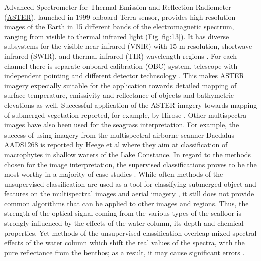 \documentclass[10pt, a4paper]{article}
\begin{document}
Advanced Spectrometer for Thermal Emission and Reflection Radiometer (\href{http://asterweb.jpl.nasa.gov/}{ASTER}), launched in
1999 onboard Terra sensor, provides high-resolution images of the Earth in 15 different bands of the
electromagnetic spectrum, ranging from visible to thermal infrared light  (Fig.\ref{fig:13}). It has diverse
subsystems for the visible near infrared (VNIR) with 15 m resolution, shortwave infrared (SWIR), and
thermal infrared (TIR) wavelength regions \cite{Kalinowski04}\label{Kalinowski04}. For each channel there is separate
onboard calibration (OBC) system, telescope with independent pointing and different detector technsology \cite{Arai05}\label{Arai05}. 
This makes ASTER imagery expecially suitable for the application towards detailed
mapping of surface temperature, emissivity and reflectance of objects and bathymetric elevations as
well. Successful application of the ASTER imagery towards mapping of submerged vegetation
reported, for example, by Hirose \cite{Hirose04} \label{Hirose04}. Other multispectra images have also been used for the
seagrass interpretation. For example, the success of using imagery from the multispectral airborne
scanner Daedalus AADS1268 is reported by Heege et al \cite{Heege03}\label{Heege03} where they aim at classification of
macrophytes in shallow waters of the Lake Constance.
In regard to the methods chosen for the image interpretation, the supervised classifications proves to
be the most worthy in a majority of case studies \cite{Palandro03,Peneva08}\label{Palandro03} \label{Peneva08}. While
often methods of the unsupervised classification are used as a tool for classifying submerged object
and features on the multispectral images and aerial imagery \cite{Fletcher09}\label{Fletcher09}, it still does not
provide common algorithms that can be applied to other images and regions. Thus, the strength of the
optical signal coming from the various types of the seafloor is strongly influenced by the effects of the
water column, its depth and chemical properties. Yet methods of the unsupervised classification
overleap mixed spectral effects of the water column which shift the real values of the spectra, with the
pure reflectance from the benthos; as a result, it may cause significant errors \cite{Dierssen03}\label{Dierssen03}.
\end{document}
